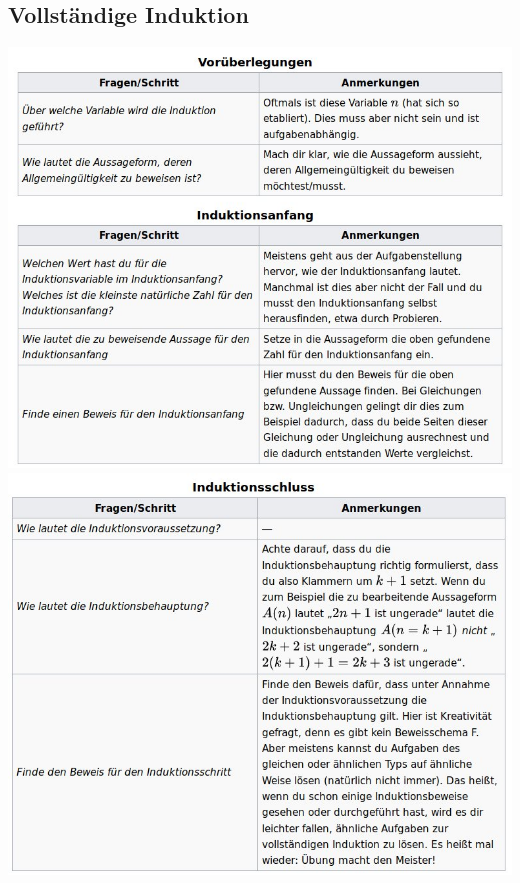 \documentclass[14pt,a4paper]{article}
\begin{document}
\subsection{Vollständige Induktion}
\includegraphics[scale=0.6]{vorlagen/induktion1.jpg} \\
\includegraphics[scale=0.6]{vorlagen/induktion2.jpg} 
\end{document}
